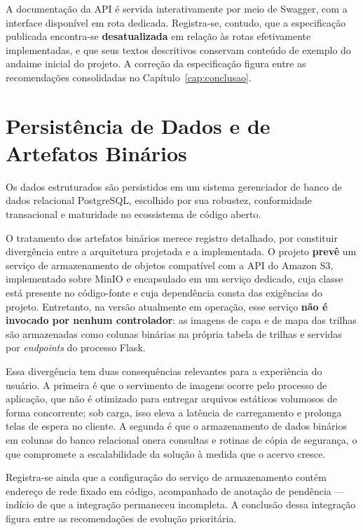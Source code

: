 A documentação da API é servida interativamente por meio de Swagger, com a
interface disponível em rota dedicada. Registra-se, contudo, que a especificação
publicada encontra-se \textbf{desatualizada} em relação às rotas efetivamente
implementadas, e que seus textos descritivos conservam conteúdo de exemplo do
andaime inicial do projeto. A correção da especificação figura entre as
recomendações consolidadas no Capítulo~\ref{cap:conclusao}.

\section{Persistência de Dados e de Artefatos Binários}
\label{sec:persistencia}

Os dados estruturados são persistidos em um sistema gerenciador de banco de dados
relacional PostgreSQL, escolhido por sua robustez, conformidade transacional e
maturidade no ecossistema de código aberto.

O tratamento dos artefatos binários merece registro detalhado, por constituir
divergência entre a arquitetura projetada e a implementada. O projeto \textbf{prevê}
um serviço de armazenamento de objetos compatível com a API do Amazon S3,
implementado sobre MinIO e encapsulado em um serviço dedicado, cuja classe está
presente no código-fonte e cuja dependência consta das exigências do projeto.
Entretanto, na versão atualmente em operação, esse serviço \textbf{não é invocado
por nenhum controlador}: as imagens de capa e de mapa das trilhas são armazenadas
como colunas binárias na própria tabela de trilhas e servidas por
\textit{endpoints} do processo Flask.

Essa divergência tem duas consequências relevantes para a experiência do usuário.
A primeira é que o servimento de imagens ocorre pelo processo de aplicação, que
não é otimizado para entregar arquivos estáticos volumosos de forma concorrente;
sob carga, isso eleva a latência de carregamento e prolonga telas de espera no
cliente. A segunda é que o armazenamento de dados binários em colunas do banco
relacional onera consultas e rotinas de cópia de segurança, o que compromete a
escalabilidade da solução à medida que o acervo cresce.

Registra-se ainda que a configuração do serviço de armazenamento contém endereço
de rede fixado em código, acompanhado de anotação de pendência --- indício de que
a integração permaneceu incompleta. A conclusão dessa integração figura entre as
recomendações de evolução prioritária.

